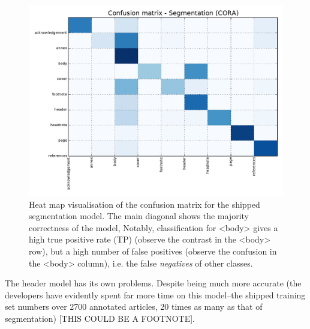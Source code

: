 \documentclass[11pt, oneside]{scrartcl}   	%
\begin{document}
\begin{figure}[!ht]
\center
\includegraphics[width=6in]{figures/confusion.pdf}
\caption{Heat map visualisation of the confusion matrix for the shipped segmentation model. The main diagonal shows the majority correctness of the model, Notably, classification for <body> gives a high true positive rate (TP) (observe the contrast in the <body> row), but a high number of false positives (observe the confusion in the <body> column), i.e. the false \emph{negatives} of other classes.}
\label{fig:seg_confusion_1}
\end{figure}

The header model has its own problems. Despite being much more accurate (the developers have evidently spent far more time on this model--the shipped training set numbers over 2700 annotated articles, 20 times as many as that of segmentation) [THIS COULD BE A FOOTNOTE].  

%
%
\end{document}
